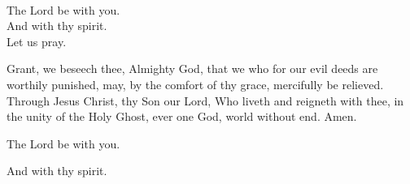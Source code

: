 \\
  \rubric{\Vbar}The Lord be with you.
\\
  \rubric{\Rbar}And with thy spirit.
\\
Let us pray.

Grant, we beseech thee, Almighty God, that we who for our evil deeds are worthily punished, may, by the comfort of thy grace, mercifully be relieved. Through Jesus Christ, thy Son our Lord, Who liveth and reigneth with thee, in the unity of the Holy Ghost, ever one God, world without end. \rubric{\Rbar} Amen.

  \rubric{\Vbar}The Lord be with you.

  \rubric{\Rbar}And with thy spirit.
